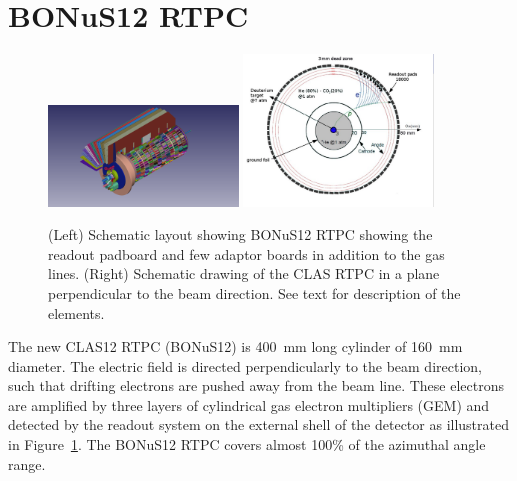 \section{BONuS12 RTPC} 

\begin{figure}
  \begin{center}
    \includegraphics[angle=0, width=0.45\textwidth, clip,trim=50mm 10mm 80mm 
     0mm]{figures/Bonus12_cad.png}
    \includegraphics[angle=0, width=0.45\textwidth,clip,trim=0mm 10mm 20mm 0mm 
     ]{figures/NKsBXp.png}
     \caption{(Left) Schematic layout showing BONuS12 RTPC showing the readout 
     padboard and few adaptor boards in addition to the gas lines. (Right) 
     Schematic drawing of the CLAS RTPC in a plane perpendicular to the beam 
     direction. See text for description of the elements.}
    \label{fig:bonus12}
  \end{center}
\end{figure}

The new CLAS12 RTPC (BONuS12) is 400~mm long cylinder of 160~mm diameter. The 
electric field is directed perpendicularly to the beam direction, such that 
drifting electrons are pushed away from the beam line.  These electrons are 
amplified by three layers of cylindrical gas electron multipliers (GEM) and 
detected by the readout system on the external shell of the detector as 
illustrated in Figure~\ref{fig:bonus12}. The BONuS12 RTPC covers almost 100\% 
of the azimuthal angle range.

